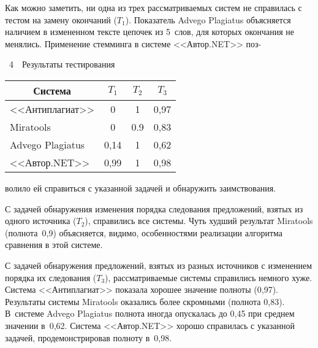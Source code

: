 \begin{multicols}{2}
  Как можно заметить, ни одна из трех рас\-смат\-ри\-ва\-емых сис\-тем не 
справилась с тестом на замену  окончаний ($T_1$). Показатель {Advego 
Plagiatus} объясняется наличием в измененном тексте цепочек из 5~слов, для 
которых окончания не менялись. Применение стемминга в сис\-те\-ме 
<<Автор.NET>> поз-\linebreak\vspace*{-12pt}

\noindent
\begin{center}  %
{{\tablename~4}\ \ \small{Результаты тестирования}}
\vspace*{2ex}

{\small \begin{tabular}{|l|c|c|c|}
\hline
\multicolumn{1}{|c|}{Система}&$T_1$&$T_2$
&$T_3$\\
\hline
<<Антиплагиат>>&0\hphantom{,99}&1&0,97\\
{Miratools}&0\hphantom{,99}&\hphantom{,9}0.9&0,83\\
{Advego Plagiatus}&0,14&1&0,62\\
<<Автор.NET>>&0,99&1&0,98\\
\hline
\end{tabular}

}
\end{center}


\pagebreak


\addtocounter{table}{1}


\noindent
волило ей справиться с указанной задачей и обнаружить 
заимствования.
  
  С задачей обнаружения изменения порядка следования предложений, взятых 
из одного источника ($T_2$), справились все сис\-те\-мы. Чуть худший 
результат {Miratools} (полнота~0,9) объясняется, видимо, особенностями 
реализации алгоритма сравнения в этой сис\-теме. 
  
  С задачей обнаружения предложений, взятых из разных источников с 
изменением порядка их следования ($T_3$), рассматриваемые сис\-те\-мы 
справились немного хуже. Сис\-те\-ма <<Антиплагиат>> показала хорошее 
значение полноты (0,97). Результаты сис\-те\-мы {Miratools} оказались 
более скромными (полнота 0,83). В~сис\-те\-ме {Advego Plagiatus} полнота 
иногда опускалась до 0,45 при среднем значении в~0,62. Сис\-те\-ма 
<<Автор.NET>> хорошо справилась с указанной задачей, продемонстрировав 
полноту в~0,98.
  

\end{multicols}
